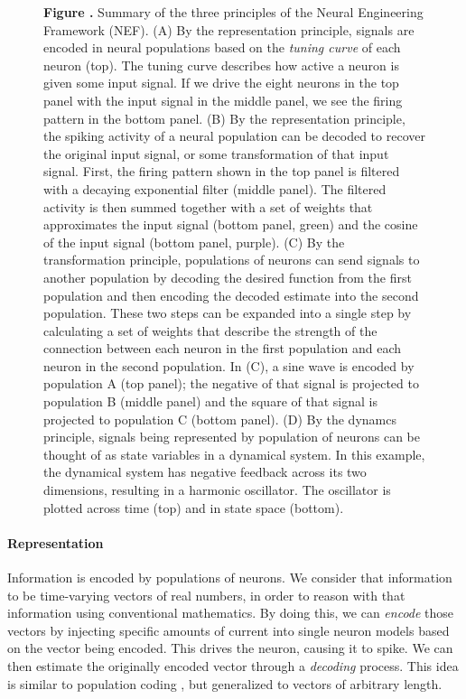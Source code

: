 \documentclass{frontiersSCNS}
\begin{document}
\begin{figure}
\begin{center}
\end{center}
 \textbf{\label{fig:nef} Figure .}{
   Summary of the three principles of the Neural Engineering Framework
   (NEF). (A) By the representation principle, signals are encoded
   in neural populations based on the \textit{tuning curve}
   of each neuron (top). The tuning curve describes
   how active a neuron is given some input signal.
   If we drive the eight neurons in the top panel
   with the input signal in the middle panel,
   we see the firing pattern in the bottom panel.
   (B) By the representation principle,
   the spiking activity of a neural population
   can be decoded to recover the original input signal,
   or some transformation of that input signal.
   First, the firing pattern shown in the top panel
   is filtered with a decaying exponential filter (middle panel).
   The filtered activity is then summed together
   with a set of weights that approximates
   the input signal (bottom panel, green)
   and the cosine of the input signal (bottom panel, purple).
   (C) By the transformation principle,
   populations of neurons can send signals
   to another population by decoding
   the desired function from the first population
   and then encoding the decoded estimate
   into the second population.
   These two steps can be expanded into a single step
   by calculating a set of weights
   that describe the strength of the connection
   between each neuron in the first population
   and each neuron in the second population.
   In (C), a sine wave is encoded by population A (top panel);
   the negative of that signal is projected
   to population B (middle panel)
   and the square of that signal is projected
   to population C (bottom panel).
   (D) By the dynamcs principle,
   signals being represented by population of neurons
   can be thought of
   as state variables in a dynamical system.
   In this example, the dynamical system
   has negative feedback across its two dimensions,
   resulting in a harmonic oscillator.
   The oscillator is plotted across time (top)
   and in state space (bottom).}
\end{figure}

\paragraph{Representation}
Information is encoded by populations of neurons.
We consider that information
to be time-varying vectors of real numbers,
in order to reason with that information
using conventional mathematics.
By doing this, we can \textit{encode}
those vectors by injecting
specific amounts of current into
single neuron models based on
the vector being encoded.
This drives the neuron,
causing it to spike.
We can then estimate
the originally encoded vector
through a \textit{decoding} process.
This idea is similar to population coding
\cite{TODO}, but generalized
to vectors of arbitrary length.
\end{document}
